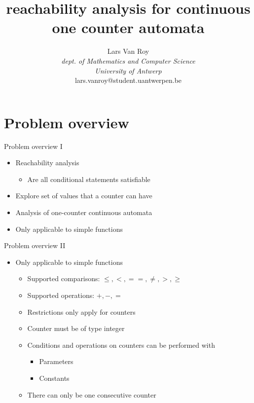 \documentclass[10pt]{beamer}
\title{reachability analysis for continuous one counter automata}
\author{Lars Van Roy\\
\textit{dept. of Mathematics and Computer Science} \\
\textit{University of Antwerp}\\
lars.vanroy@student.uantwerpen.be}
\begin{document}
\maketitle

\section{Problem overview}

\begin{frame}{Problem overview I}
	\begin{itemize}
	    \item Reachability analysis
	    \begin{itemize}
	    	\pause
	    	\item Are all conditional statements satisfiable
    	\end{itemize}
    	\pause
    	\item Explore set of values that a counter can have
    	\pause
    	\item Analysis of one-counter continuous automata
    	\pause
    	\item Only applicable to simple functions
	\end{itemize}
\end{frame}

\begin{frame}{Problem overview II}
	\begin{itemize}
		\item Only applicable to simple functions
		\begin{itemize}
			\pause
			\item Supported comparisons: $\leq, <, ==, \ne, >, \geq$
			\pause
			\item Supported operations: $+, -, =$
			\pause
			\item Restrictions only apply for counters
			\pause
			\item Counter must be of type integer
			\pause
			\item Conditions and operations on counters can be performed with
			\begin{itemize}
				\item Parameters
				\item Constants
			\end{itemize}
			\pause
			\item There can only be one consecutive counter
		\end{itemize}
	\end{itemize}
\end{frame}
\end{document}
